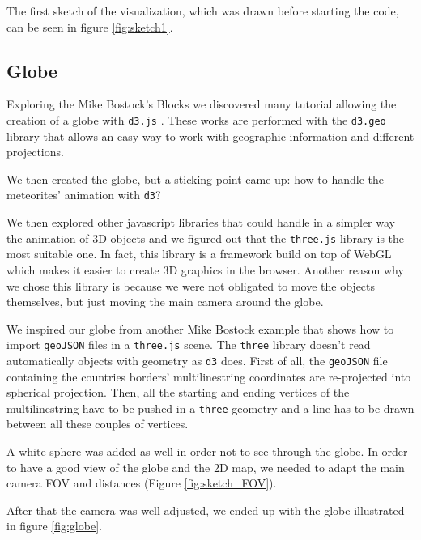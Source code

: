 \documentclass[10pt,conference,compsocconf]{IEEEtran}
\begin{document}
The first sketch of the visualization, which was drawn before starting the code, can be seen in figure \ref{fig:sketch1}.




\subsection{Globe}
Exploring the Mike Bostock's Blocks \cite{bostock_mike_nodate} we discovered many tutorial allowing the creation of a globe with \texttt{d3.js} \cite{bostock_see-through_nodate,bostock_globe_nodate}.  These works are performed with the \texttt{d3.geo} library that allows an easy way to work with geographic information and different projections.

We then created the globe, but a sticking point came up: how to handle the meteorites' animation with \texttt{d3}?

We then explored other javascript libraries that could handle in a simpler way the animation of 3D objects and we figured out that the \texttt{three.js} library \cite{BibEntry2017Nov} is the most suitable one. In fact, this library is a framework build on top of WebGL which makes it easier to create 3D graphics in the browser. 
Another reason why we chose this library is because we were not obligated to move the objects themselves, but just moving the main camera around the globe. 

We inspired our globe from another Mike Bostock example \cite{BibEntry2017Aug} that shows how to import \texttt{geoJSON} files in a \texttt{three.js} scene. The \texttt{three} library doesn't read automatically objects with geometry as \texttt{d3} does. First of all, the \texttt{geoJSON} file containing the countries borders' multilinestring \cite{countryfile} coordinates are re-projected into spherical projection. Then, all the starting and ending vertices of the multilinestring have to be pushed in a \texttt{three} geometry and a line has to be drawn between all these couples of vertices.


A white sphere was added as well in order not to see through the globe. In order to have a good view of the globe and the 2D map, we needed to adapt the main camera FOV and distances (Figure \ref{fig:sketch_FOV}).

After that the camera was well adjusted, we ended up with the globe illustrated in figure \ref{fig:globe}.
\end{document}
